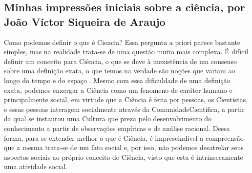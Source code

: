 \subsection{Minhas impressões iniciais sobre a ciência, por João Víctor Siqueira de Araujo}

Como podemos definir o que é \gls{Ciencia}? Essa pergunta a priori parece bastante simples, mas na realidade trata-se de uma questão muito mais complexa. É difícil definir um conceito para Ciência, o que se deve à inexistência de um consenso sobre uma definição exata, o que temos na verdade são noções que variam ao longo do tempo e do espaço \citep{schwartzman_ciencia_1984}. Mesmo com essa dificuldade de uma definição exata, podemos enxergar a Ciência como um \gls{fenomeno} de caráter humano e principalmente social, em virtude que a Ciência é feita por pessoas, os \gls{Cientista}s, e essas pessoas interagem socialmente através da \gls{ComunidadeCientifica}, a partir da qual se instaurou uma \gls{Cultura} que preza pelo desenvolvimento do conhecimento a partir de observações empíricas e de análise racional. Dessa forma, para se entender melhor o que é Ciência, é imprescindível a compreensão que a mesma trata-se de um fato social e, por isso, não podemos desatrelar seus aspectos sociais ao próprio conceito de Ciência, visto que esta é intrinsecamente uma atividade social.